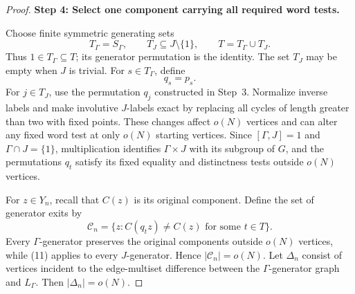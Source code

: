 \documentclass[10pt]{article}
\newcommand{\stephead}[1]{\par\medskip\noindent\textbf{#1}\par\smallskip}
\newcommand{\abs}[1]{\left|#1\right|}
\begin{document}
\begin{proof}
\stephead{Step 4: Select one component carrying all required word tests.}
Choose finite symmetric generating sets
\[
T_\Gamma=S_\Gamma,\qquad T_J\subseteq J\setminus\{1\},\qquad T=T_\Gamma\cup T_J.
\]
Thus $1\in T_\Gamma\subseteq T$; its generator permutation is the identity. The set $T_J$ may be empty when $J$ is trivial. For $s\in T_\Gamma$, define
\[
q_s=p_s.
\]
For $j\in T_J$, use the permutation $q_j$ constructed in Step~3. Normalize inverse labels and make involutive $J$-labels exact by replacing all cycles of length greater than two with fixed points. These changes affect $o(N)$ vertices and can alter any fixed word test at only $o(N)$ starting vertices. Since $[\Gamma,J]=1$ and $\Gamma\cap J=\{1\}$, multiplication identifies $\Gamma\times J$ with its subgroup of $G$, and the permutations $q_t$ satisfy its fixed equality and distinctness tests outside $o(N)$ vertices.

For $z\in Y_n$, recall that $C(z)$ is its original component. Define the set of generator exits by
\[
\mathcal C_n=\{z:C(q_tz)\neq C(z)\text{ for some }t\in T\}.
\]
Every $\Gamma$-generator preserves the original components outside $o(N)$ vertices, while (11) applies to every $J$-generator. Hence $\abs{\mathcal C_n}=o(N)$. Let $\Delta_n$ consist of vertices incident to the edge-multiset difference between the $\Gamma$-generator graph and $L_\Gamma$. Then $\abs{\Delta_n}=o(N)$.


\end{proof}
\end{document}
